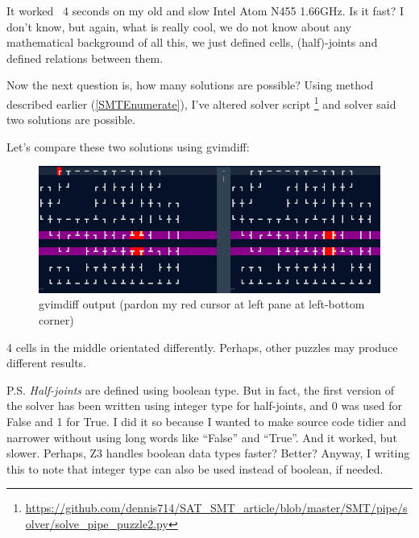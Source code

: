 It worked ~4 seconds on my old and slow Intel Atom N455 1.66GHz.
Is it fast? I don't know, but again, what is really cool, we do not know about any mathematical background
of all this, we just defined cells, (half)-joints and defined relations between them.

Now the next question is, how many solutions are possible?
Using method described earlier (\ref{SMTEnumerate}), I've altered solver script
\footnote{\url{https://github.com/dennis714/SAT_SMT_article/blob/master/SMT/pipe/solver/solve_pipe_puzzle2.py}} and solver
said two solutions are possible.

Let's compare these two solutions using gvimdiff:

\begin{figure}[H]
\centering
\includegraphics[scale=0.75]{SMT/pipe/solver/diff.png}
\caption{gvimdiff output (pardon my red cursor at left pane at left-bottom corner)}
\end{figure}

4 cells in the middle orientated differently.
Perhaps, other puzzles may produce different results.

P.S.
\textit{Half-joints} are defined using boolean type.
But in fact, the first version of the solver has been written using integer type for half-joints,
and 0 was used for False and 1 for True.
I did it so because I wanted to make source code tidier and narrower without using long words like ``False'' and ``True''.
And it worked, but slower. Perhaps, Z3 handles boolean data types faster? Better?
Anyway, I writing this to note that integer type can also be used instead of boolean, if needed.

